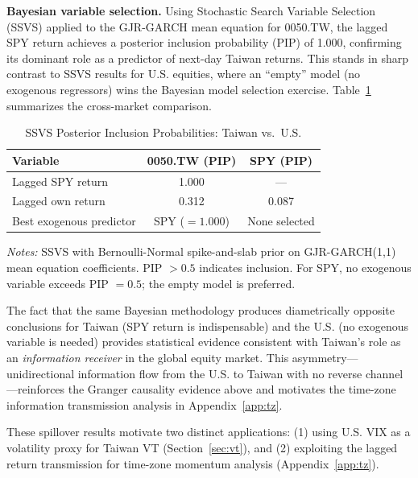 \textbf{Bayesian variable selection.} Using Stochastic Search Variable Selection (SSVS) applied to the GJR-GARCH mean equation for 0050.TW, the lagged SPY return achieves a posterior inclusion probability (PIP) of 1.000, confirming its dominant role as a predictor of next-day Taiwan returns. This stands in sharp contrast to SSVS results for U.S. equities, where an ``empty'' model (no exogenous regressors) wins the Bayesian model selection exercise. Table~\ref{tab:ssvs_pip} summarizes the cross-market comparison.

\begin{table}[H]
\centering
\caption{SSVS Posterior Inclusion Probabilities: Taiwan vs.\ U.S.}
\label{tab:ssvs_pip}
\begin{tabular}{lcc}
\toprule
Variable & 0050.TW (PIP) & SPY (PIP) \\
\midrule
Lagged SPY return & 1.000 & --- \\
Lagged own return & 0.312 & 0.087 \\
Best exogenous predictor & SPY ($= 1.000$) & None selected \\
\bottomrule
\end{tabular}
\begin{flushleft}
\small \textit{Notes:} SSVS with Bernoulli-Normal spike-and-slab prior on GJR-GARCH(1,1) mean equation coefficients. PIP $> 0.5$ indicates inclusion. For SPY, no exogenous variable exceeds PIP $= 0.5$; the empty model is preferred.
\end{flushleft}
\end{table}

The fact that the same Bayesian methodology produces diametrically opposite conclusions for Taiwan (SPY return is indispensable) and the U.S. (no exogenous variable is needed) provides statistical evidence consistent with Taiwan's role as an \textit{information receiver} in the global equity market. This asymmetry---unidirectional information flow from the U.S. to Taiwan with no reverse channel---reinforces the Granger causality evidence above and motivates the time-zone information transmission analysis in Appendix~\ref{app:tz}.

These spillover results motivate two distinct applications: (1) using U.S. VIX as a volatility proxy for Taiwan VT (Section~\ref{sec:vt}), and (2) exploiting the lagged return transmission for time-zone momentum analysis (Appendix~\ref{app:tz}).



